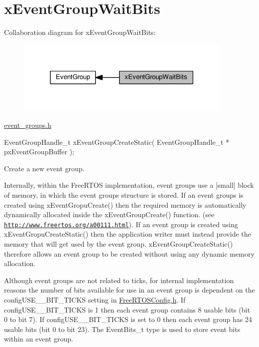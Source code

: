 \hypertarget{group__xEventGroupWaitBits}{}\section{x\+Event\+Group\+Wait\+Bits}
\label{group__xEventGroupWaitBits}
Collaboration diagram for x\+Event\+Group\+Wait\+Bits\+:\nopagebreak
\begin{figure}[H]
\begin{center}
\leavevmode
\includegraphics[width=295pt]{d6/d9a/group__xEventGroupWaitBits}
\end{center}
\end{figure}
\hyperlink{event__groups_8h}{event\+\_\+groups.\+h} 
\begin{DoxyPre}
EventGroupHandle\_t xEventGroupCreateStatic( EventGroupHandle\_t * pxEventGroupBuffer );
\end{DoxyPre}


Create a new event group.

Internally, within the Free\+R\+T\+OS implementation, event groups use a \mbox{[}small\mbox{]} block of memory, in which the event group\textquotesingle{}s structure is stored. If an event groups is created using x\+Event\+Gropu\+Create() then the required memory is automatically dynamically allocated inside the x\+Event\+Group\+Create() function. (see \href{http://www.freertos.org/a00111.html}{\tt http\+://www.\+freertos.\+org/a00111.\+html}). If an event group is created using x\+Event\+Gropu\+Create\+Static() then the application writer must instead provide the memory that will get used by the event group. x\+Event\+Group\+Create\+Static() therefore allows an event group to be created without using any dynamic memory allocation.

Although event groups are not related to ticks, for internal implementation reasons the number of bits available for use in an event group is dependent on the config\+U\+S\+E\+\_\+\_\+\+B\+I\+T\+\_\+\+T\+I\+C\+KS setting in \hyperlink{FreeRTOSConfig_8h}{Free\+R\+T\+O\+S\+Config.\+h}. If config\+U\+S\+E\+\_\+\_\+\+B\+I\+T\+\_\+\+T\+I\+C\+KS is 1 then each event group contains 8 usable bits (bit 0 to bit 7). If config\+U\+S\+E\+\_\+\_\+\+B\+I\+T\+\_\+\+T\+I\+C\+KS is set to 0 then each event group has 24 usable bits (bit 0 to bit 23). The Event\+Bits\+\_\+t type is used to store event bits within an event group.


